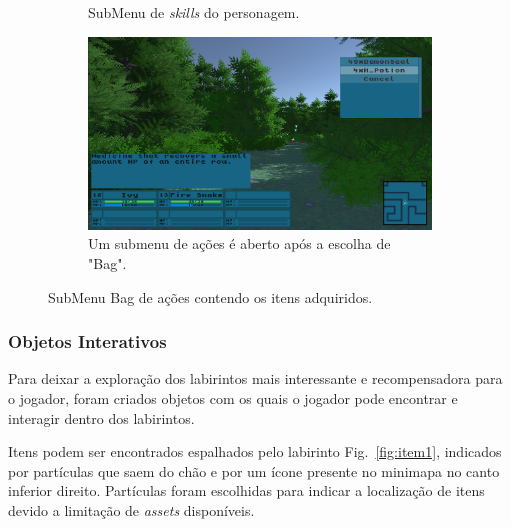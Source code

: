\begin{figure}[h!]
\begin{subfigure}[b]{0.45\linewidth}
    \caption{SubMenu de \emph{skills} do personagem.}
  \end{subfigure}
  \begin{subfigure}[b]{0.45\linewidth}
    \includegraphics[width=\linewidth]{bag.jpg}
    \caption{Um submenu de ações é aberto após a escolha de "Bag".}
  \end{subfigure}
  \caption{SubMenu Bag de ações contendo os itens adquiridos.}
  \label{fig:menu2}
\end{figure}
\pagebreak
\subsubsection{Objetos Interativos}\label{chap:interactables}

Para deixar a exploração dos labirintos mais interessante e recompensadora para o jogador, foram criados objetos com os quais o jogador pode encontrar e interagir dentro dos labirintos.

	Itens podem ser encontrados espalhados pelo labirinto Fig.~\ref{fig:item1}, indicados por partículas que saem do chão e por um ícone presente no minimapa no canto inferior direito. Partículas foram escolhidas para indicar a localização de itens devido a limitação de \emph{assets} disponíveis.
	
